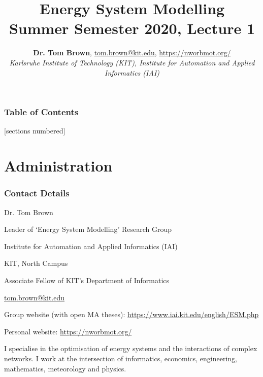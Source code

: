 \documentclass[10pt,aspectratio=169,dvipsnames]{beamer}
\title{Energy System Modelling\\ Summer Semester 2020, Lecture 1}
\author{
  {\bf Dr. Tom Brown}, \href{mailto:tom.brown@kit.edu}{tom.brown@kit.edu}, \url{https://nworbmot.org/}\\
  \emph{Karlsruhe Institute of Technology (KIT), Institute for Automation and Applied Informatics (IAI)}
}
\date{}
\begin{document}
\maketitle


\begin{frame}

  \frametitle{Table of Contents}
  [sections numbered]
  \tableofcontents[hideallsubsections]
\end{frame}


\section{Administration}




\begin{frame}
  \frametitle{Contact Details}

  Dr. Tom Brown

  Leader of `Energy System Modelling' Research Group

  Institute for Automation and Applied Informatics (IAI)

  KIT, North Campus

  Associate Fellow of KIT's Department of Informatics

  \href{mailto:tom.brown@kit.edu}{tom.brown@kit.edu}

  Group website (with \alert{open MA theses}): \url{https://www.iai.kit.edu/english/ESM.php}

  Personal website: \url{https://nworbmot.org/}

I  specialise in the optimisation of energy
systems and the interactions of complex networks. I work at the
intersection of informatics, economics, engineering, mathematics,
meteorology and physics.

\end{frame}
\end{document}
